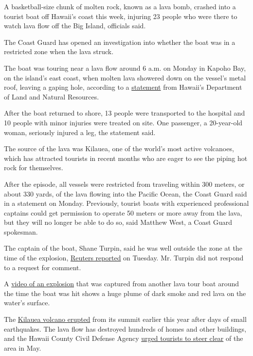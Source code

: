 A basketball-size chunk of molten rock, known as a lava bomb, crashed
into a tourist boat off Hawaii's coast this week, injuring 23 people who
were there to watch lava flow off the Big Island, officials said.

The Coast Guard has opened an investigation into whether the boat was in
a restricted zone when the lava struck.

The boat was touring near a lava flow around 6 a.m. on Monday in Kapoho
Bay, on the island's east coast, when molten lava showered down on the
vessel's metal roof, leaving a gaping hole, according to a
\href{http://dlnr.hawaii.gov/blog/2018/07/16/nr18-140/}{statement} from
Hawaii's Department of Land and Natural Resources.

After the boat returned to shore, 13 people were transported to the
hospital and 10 people with minor injuries were treated on site. One
passenger, a 20-year-old woman, seriously injured a leg, the statement
said.

The source of the lava was Kilauea, one of the world's most active
volcanoes, which has attracted tourists in recent months who are eager
to see the piping hot rock for themselves.

After the episode, all vessels were restricted from traveling within 300
meters, or about 330 yards, of the lava flowing into the Pacific Ocean,
the Coast Guard said in a statement on Monday. Previously, tourist boats
with experienced professional captains could get permission to operate
50 meters or more away from the lava, but they will no longer be able to
do so, said Matthew West, a Coast Guard spokesman.

The captain of the boat, Shane Turpin, said he was well outside the zone
at the time of the explosion,
\href{https://www.nytimes3xbfgragh.onion/reuters/2018/07/17/us/17reuters-hawaii-volcano-tours.html}{Reuters
reported} on Tuesday. Mr. Turpin did not respond to a request for
comment.

A
\href{https://www.facebookcorewwwi.onion/ikaika.marzo/videos/1887564864629374/?hc_location=ufi}{video
of an explosion} that was captured from another lava tour boat around
the time the boat was hit shows a huge plume of dark smoke and red lava
on the water's surface.

The
\href{https://www.nytimes3xbfgragh.onion/2018/05/17/us/eruption-volcano-hawaii-kilauea.html}{Kilauea
volcano erupted} from its summit earlier this year after days of small
earthquakes. The lava flow has destroyed hundreds of homes and other
buildings, and the Hawaii County Civil Defense Agency
\href{https://www.nytimes3xbfgragh.onion/2018/05/07/us/hawaii-volcano-kilauea.html}{urged
tourists to steer clear} of the area in May.

